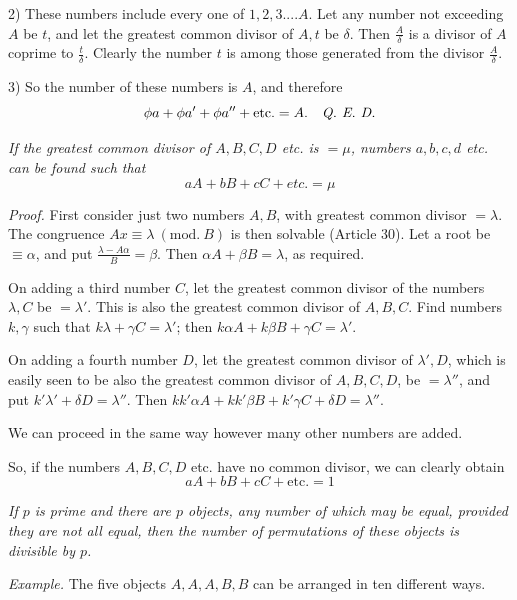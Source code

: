 2) These numbers include every one of $1,2,3....A$. Let any number not exceeding $A$ be $t$, and let the greatest common divisor of $A,t$ be $\delta$. Then $\frac{A}{\delta}$ is a divisor of $A$ coprime to $\frac{t}{\delta}$. Clearly the number $t$ is among those generated from the divisor $\frac{A}{\delta}$.

3) So the number of these numbers is $A$, and therefore
\[\phi a+\phi a'+\phi a''+\mathrm{etc.}=A.\quad\emph{Q. E. D.}\]

\emph{If the greatest common divisor of $A,B,C,D$ etc. is $=\mu$, numbers $a,b,c,d$ etc. can be found such that}
\[aA+bB+cC+\textit{etc.}=\mu\]

\emph{Proof.} First consider just two numbers $A,B$, with greatest common divisor $=\lambda$. The congruence $Ax\equiv\lambda\ (\mathrm{mod.}\ B)$ is then solvable (Article 30). Let a root be $\equiv\alpha$, and put $\frac{\lambda-A\alpha}{B}=\beta$. Then $\alpha A+\beta B=\lambda$, as required.

On adding a third number $C$, let the greatest common divisor of the numbers $\lambda,C$ be $=\lambda'$. This is also the greatest common divisor of $A,B,C$. Find numbers $k,\gamma$ such that $k\lambda+\gamma C=\lambda'$; then $k\alpha A+k\beta B+\gamma C=\lambda'$.

On adding a fourth number $D$, let the greatest common divisor of $\lambda',D$, which is easily seen to be also the greatest common divisor of $A,B,C,D$, be $=\lambda''$, and put $k'\lambda'+\delta D=\lambda''$. Then $kk'\alpha A+kk'\beta B+k'\gamma C+\delta D=\lambda''$.

We can proceed in the same way however many other numbers are added.

So, if the numbers $A,B,C,D$ etc. have no common divisor, we can clearly obtain
\[aA+bB+cC+\mathrm{etc.}=1\]

\emph{If $p$ is prime and there are $p$ objects, any number of which may be equal, provided they are not all equal, then the number of permutations of these objects is divisible by $p$.}

\emph{Example.} The five objects $A,A,A,B,B$ can be arranged in ten different ways.

